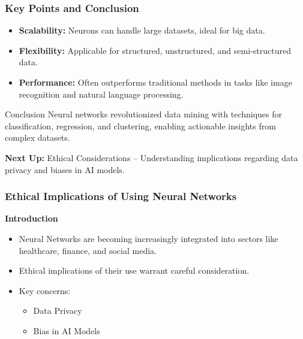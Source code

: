 \documentclass[aspectratio=169]{beamer}
\begin{document}
\begin{frame}[fragile]
    \frametitle{Key Points and Conclusion}

    \begin{itemize}
        \item \textbf{Scalability:} Neurons can handle large datasets, ideal for big data.
        \item \textbf{Flexibility:} Applicable for structured, unstructured, and semi-structured data.
        \item \textbf{Performance:} Often outperforms traditional methods in tasks like image recognition and natural language processing.
    \end{itemize}

    \vspace{1em}
    \begin{block}{Conclusion}
        Neural networks revolutionized data mining with techniques for classification, regression, and clustering, enabling actionable insights from complex datasets.
    \end{block}

    \vspace{1em}
    \textbf{Next Up:} Ethical Considerations – Understanding implications regarding data privacy and biases in AI models.
\end{frame}

\begin{frame}[fragile]
    \frametitle{Ethical Implications of Using Neural Networks}
    \textbf{Introduction}
    \begin{itemize}
        \item Neural Networks are becoming increasingly integrated into sectors like healthcare, finance, and social media.
        \item Ethical implications of their use warrant careful consideration.
        \item Key concerns: 
        \begin{itemize}
            \item Data Privacy
            \item Bias in AI Models
        \end{itemize}
    \end{itemize}
\end{frame}
\end{document}
